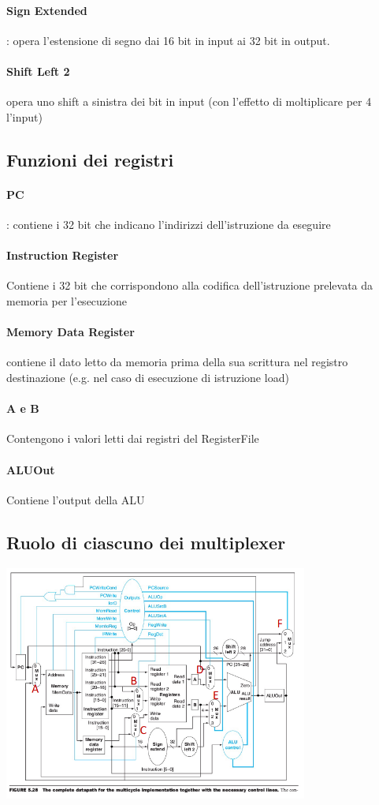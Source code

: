 \documentclass[12pt, a4paper, openany]{book}
\begin{document}
\paragraph*{Sign Extended}: opera l'estensione di segno dai 16 bit in input ai 32 bit in output.
\paragraph*{Shift Left 2} opera uno shift a sinistra dei bit in input (con l'effetto di 
moltiplicare per 4 l'input)

\subsection{Funzioni dei registri}
\paragraph*{PC}: contiene i 32 bit che indicano l'indirizzi dell'istruzione da eseguire
\paragraph*{Instruction Register} Contiene i 32 bit che corrispondono alla codifica
dell'istruzione prelevata da memoria per l'esecuzione
\paragraph*{Memory Data Register} contiene il dato letto da memoria prima della sua scrittura
nel registro destinazione (e.g. nel caso di esecuzione di istruzione load)
\paragraph*{A e B} Contengono i valori letti dai registri del RegisterFile
\paragraph*{ALUOut} Contiene l'output della ALU
\subsection{Ruolo di ciascuno dei multiplexer}
\begin{center}
    \includegraphics[width=100mm, scale=0.5]{Datapath Multiplexer.png}
\end{center}
\end{document}
